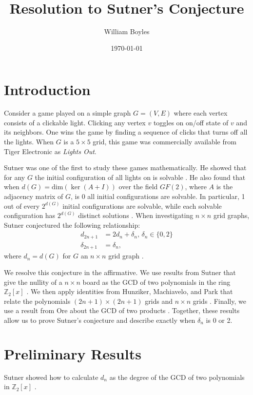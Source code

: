\documentclass[a4paper]{article}
\newcommand{\Z}{\mathbb{Z}}
\renewcommand{\dim}[1]{\text{dim}\left( #1 \right)}
\begin{document}
	\title{Resolution to Sutner's Conjecture}
	\author{William Boyles}
	\date{\today}
	\maketitle
	
	\section{Introduction}
	Consider a game played on a simple graph $G = (V,E)$ where each vertex consists of a clickable light.
	Clicking any vertex $v$ toggles on on/off state of $v$ and its neighbors.
	One wins the game by finding a sequence of clicks that turns off all the lights.
	When $G$ is a $5 \times 5$ grid, this game was commercially available from Tiger Electronic as \textit{Lights Out}.
	
	Sutner was one of the first to study these games mathematically.
	He showed that for any $G$ the initial configuration of all lights on is solvable \cite{Sutner1989}.
	He also found that when $d(G) = \dim{\ker{(A + I)}}$ over the field $GF(2)$, where $A$ is the adjacency matrix of $G$, is 0 all initial configurations are solvable.
	In particular, 1 out of every $2^{d(G)}$ initial configurations are solvable, while each solvable configuration has $2^{d(G)}$ distinct solutions \cite{Sutner1989}.
	When investigating $n \times n$ grid graphs, Sutner conjectured the following relationship:
	\begin{align*}
		d_{2n+1} &= 2d_n + \delta_n \text{, } \delta_n \in \{0,2\} \\
		\delta_{2n+1} &= \delta_n,
	\end{align*}
	where $d_n = d(G)$ for $G$ an $n \times n$ grid graph \cite{Sutner1989}.
	
	We resolve this conjecture in the affirmative.
	We use results from Sutner that give the nullity of a $n \times n$ board as the GCD of two polynomials in the ring $\Z_2[x]$ \cite{Sutner96sigma-automataand}.
	We then apply identities from Hunziker, Machiavelo, and Park that relate the polynomials $(2n+1) \times (2n+1)$ grids and $n \times n$ grids \cite{HUNZIKER2004465}.
	Finally, we use a result from Ore about the GCD of two products \cite{ore_number_theory}.
	Together, these results allow us to prove Sutner's conjecture and describe exactly when $\delta_n$ is 0 or 2.
	
	\section{Preliminary Results}
	Sutner showed how to calculate $d_n$ as the degree of the GCD of two polynomials in $\Z_2[x]$ \cite{Sutner96sigma-automataand}.
	
\end{document}
